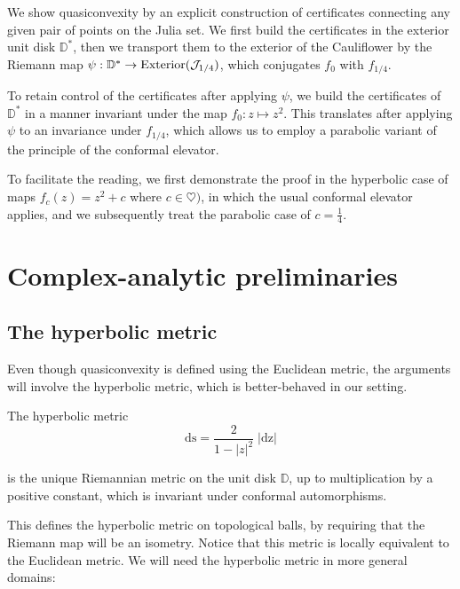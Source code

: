 We show quasiconvexity by an explicit construction of certificates connecting any given pair of points on the Julia set.
We first build the certificates in the exterior unit disk $\mathbb D ^*$, 
then we transport them to the exterior of the Cauliflower by the Riemann map $\psi: \mathbb D ^* \to \operatorname{Exterior}(\mathcal J_{1 / 4})$, 
which conjugates $f_0$ with $f_{1/4}$.

To retain control of the certificates after applying $\psi$, 
we build the certificates of $\mathbb D^*$ in a manner invariant under the map $f_0: z\mapsto z^2$.
This translates after applying $\psi$ to an invariance under $f_{1/4}$,
which allows us to employ a parabolic variant of the principle of the conformal elevator.

To facilitate the reading, we first demonstrate the proof in the hyperbolic case of maps $f_c(z)=z^2+c$ where 
$c\in \heartsuit)$, in which the usual conformal elevator applies, 
and we subsequently treat the parabolic case of $c=\frac{1}{4}$.

\section{Complex-analytic preliminaries}

\subsection{The hyperbolic metric}
Even though quasiconvexity is defined using the Euclidean metric, 
the arguments will involve the hyperbolic metric, which is better-behaved in our setting.

\begin{theorem}
	The hyperbolic metric
	\begin{equation} \label{thm: hyp-metric-in-disk}
		\mathrm{ds} = \frac {2}{1-|z|^2}\;|\mathrm {dz}|
	\end{equation}
	
	is the unique Riemannian metric on the unit disk $\mathbb D$, up to multiplication
	by a positive constant, which is invariant under conformal automorphisms.
\end{theorem}

This defines the hyperbolic metric on topological balls, by requiring that the Riemann map
will be an isometry. Notice that this metric is locally equivalent to the Euclidean metric.
We will need the hyperbolic metric in more general domains:

